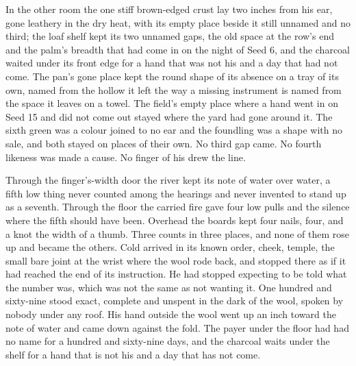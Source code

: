 In the other room the one stiff brown-edged crust lay two inches from his ear, gone leathery in the dry heat, with its empty place beside it still unnamed and no third; the loaf shelf kept its two unnamed gaps, the old space at the row's end and the palm's breadth that had come in on the night of Seed 6, and the charcoal waited under its front edge for a hand that was not his and a day that had not come. The pan's gone place kept the round shape of its absence on a tray of its own, named from the hollow it left the way a missing instrument is named from the space it leaves on a towel. The field's empty place where a hand went in on Seed 15 and did not come out stayed where the yard had gone around it. The sixth green was a colour joined to no ear and the foundling was a shape with no sale, and both stayed on places of their own. No third gap came. No fourth likeness was made a cause. No finger of his drew the line.

Through the finger's-width door the river kept its note of water over water, a fifth low thing never counted among the hearings and never invented to stand up as a seventh. Through the floor the carried fire gave four low pulls and the silence where the fifth should have been. Overhead the boards kept four nails, four, and a knot the width of a thumb. Three counts in three places, and none of them rose up and became the others. Cold arrived in its known order, cheek, temple, the small bare joint at the wrist where the wool rode back, and stopped there as if it had reached the end of its instruction. He had stopped expecting to be told what the number was, which was not the same as not wanting it. One hundred and sixty-nine stood exact, complete and unspent in the dark of the wool, spoken by nobody under any roof. His hand outside the wool went up an inch toward the note of water and came down against the fold. The payer under the floor had had no name for a hundred and sixty-nine days, and the charcoal waits under the shelf for a hand that is not his and a day that has not come.

